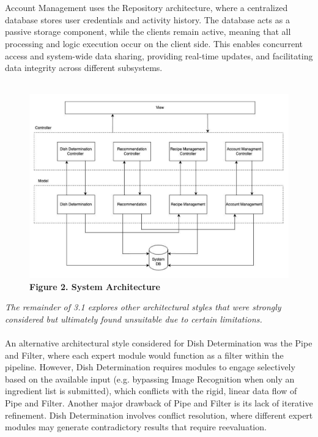 \documentclass[]{article}
\begin{document}
\\
\\
Account Management uses the Repository architecture, where a centralized database stores user credentials and activity history. 
The database acts as a passive storage component, while the clients remain active, meaning that all processing and logic execution occur on the client side. 
This enables concurrent access and system-wide data sharing, providing real-time updates, and facilitating data integrity across different subsystems.
\\
\\
\begin{figure}[H]
    \centering
    \includegraphics[width=\textwidth]{image/3.1_system_arch.pdf}
    \caption{\textbf{Figure 2. System Architecture}}
\end{figure}
\textit{The remainder of  3.1 explores other architectural styles that were strongly considered but ultimately found unsuitable due to certain limitations.}
\\
\\
An alternative architectural style considered for Dish Determination was the Pipe and Filter, where each expert module would function as a filter within the pipeline. 
However, Dish Determination requires modules to engage selectively based on the available input (e.g. bypassing Image Recognition when only an ingredient list is submitted), which conflicts with the rigid, linear data flow of Pipe and Filter. 
Another major drawback of Pipe and Filter is its lack of iterative refinement. 
Dish Determination involves conflict resolution, where different expert modules may generate contradictory results that require reevaluation. 
\end{document}
